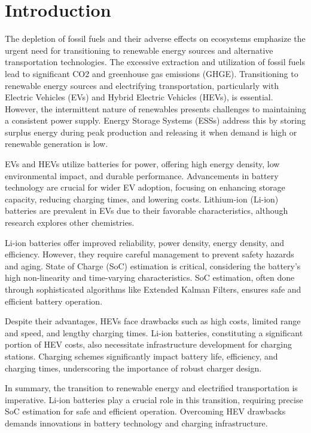 \documentclass[conference]{IEEEtran}
\begin{document}
\section{Introduction}
The depletion of fossil fuels and their adverse effects on ecosystems emphasize the urgent need for transitioning to renewable energy sources and alternative transportation technologies. The excessive extraction and utilization of fossil fuels lead to significant CO2 and greenhouse gas emissions (GHGE). Transitioning to renewable energy sources and electrifying transportation, particularly with Electric Vehicles (EVs) and Hybrid Electric Vehicles (HEVs), is essential. However, the intermittent nature of renewables presents challenges to maintaining a consistent power supply. Energy Storage Systems (ESSs) address this by storing surplus energy during peak production and releasing it when demand is high or renewable generation is low.

EVs and HEVs utilize batteries for power, offering high energy density, low environmental impact, and durable performance. Advancements in battery technology are crucial for wider EV adoption, focusing on enhancing storage capacity, reducing charging times, and lowering costs. Lithium-ion (Li-ion) batteries are prevalent in EVs due to their favorable characteristics, although research explores other chemistries.

Li-ion batteries offer improved reliability, power density, energy density, and efficiency. However, they require careful management to prevent safety hazards and aging. State of Charge (SoC) estimation is critical, considering the battery's high non-linearity and time-varying characteristics. SoC estimation, often done through sophisticated algorithms like Extended Kalman Filters, ensures safe and efficient battery operation.

Despite their advantages, HEVs face drawbacks such as high costs, limited range and speed, and lengthy charging times. Li-ion batteries, constituting a significant portion of HEV costs, also necessitate infrastructure development for charging stations. Charging schemes significantly impact battery life, efficiency, and charging times, underscoring the importance of robust charger design.

In summary, the transition to renewable energy and electrified transportation is imperative. Li-ion batteries play a crucial role in this transition, requiring precise SoC estimation for safe and efficient operation. Overcoming HEV drawbacks demands innovations in battery technology and charging infrastructure.
\end{document}
